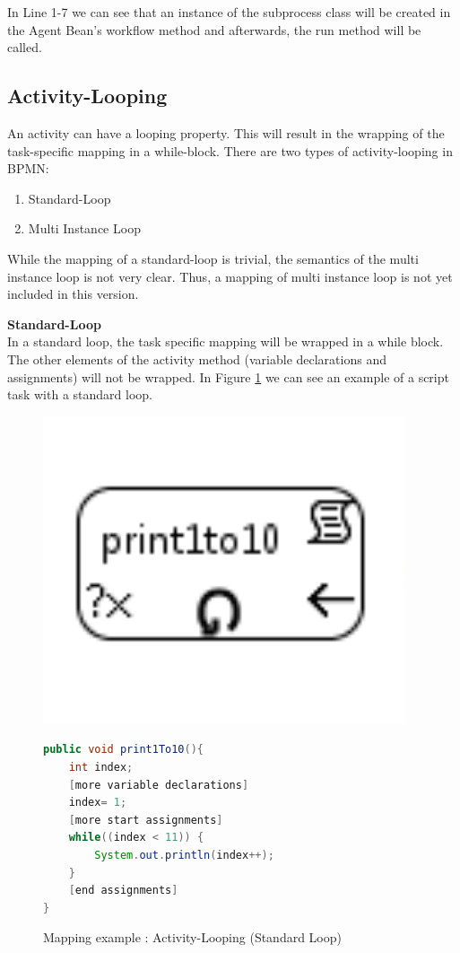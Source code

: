 In Line 1-7 we can see that an instance of the subprocess class will be created in the Agent Bean's workflow method and afterwards, the run method will be called.
\subsection{Activity-Looping}
An activity can have a looping property. This will result in the wrapping of the task-specific mapping in a while-block. 
There are two types of activity-looping in BPMN:
\begin{enumerate}
	\item Standard-Loop
	\item Multi Instance Loop
\end{enumerate}
While the mapping of a standard-loop is trivial, the semantics of the multi instance loop is not very clear. Thus, a mapping of multi instance loop is not yet included in this version.
 
\textbf{Standard-Loop}\\
In a standard loop, the task specific mapping will be wrapped in a while block. The other elements of the activity method (variable declarations and assignments) will not be wrapped.  In Figure \ref{fig:mapping_standardLoop} we can see an example of a script task with a standard loop.
\begin{figure}[h]
\begin{minipage}[c]{0.3\textwidth}
\includegraphics[width=0.95\textwidth]{images/mapping/standard_loop.png}
\end{minipage}
\begin{minipage}[c]{0.7\textwidth}
\begin{lstlisting}[language=Java]
public void print1To10(){
	int index;
	[more variable declarations]
	index= 1;
	[more start assignments]
	while((index < 11)) {
		System.out.println(index++);
	}
	[end assignments]
}
\end{lstlisting}
\end{minipage}
\caption{Mapping example : Activity-Looping (Standard Loop)}%
\label{fig:mapping_standardLoop}%
\end{figure}
